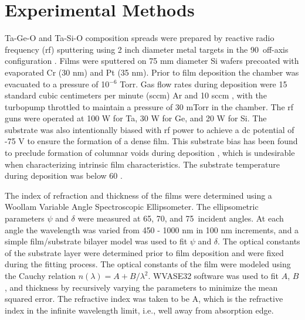 \section{Experimental Methods}
Ta-Ge-O and Ta-Si-O composition spreads were prepared by reactive radio frequency (rf) sputtering using 2 inch diameter metal targets in the 90\textdegree \ off-axis configuration \cite{VanDover1998}. Films were sputtered on 75 mm diameter Si wafers precoated with evaporated Cr (30 nm) and Pt (35 nm). Prior to film deposition the chamber was evacuated to a pressure of 10$^{-6}$ Torr. Gas flow rates during deposition were 15 standard cubic centimeters per minute (sccm) Ar and 10 sccm , with the turbopump throttled to maintain a pressure of 30 mTorr in the chamber. The rf guns were operated at 100 W for Ta, 30 W for Ge, and 20 W for Si. The substrate was also intentionally biased with rf power to achieve a dc potential of -75 V to ensure the formation of a dense film. This substrate bias has been found to preclude formation of columnar voids during deposition \cite{Barron2009}, which is undesirable when characterizing intrinsic film characteristics. The substrate temperature during deposition was below 60 \textcelsius. 

The index of refraction and thickness of the films were determined using a Woollam Variable Angle Spectroscopic Ellipsometer. The ellipsometric parameters $\psi$ and $\delta$ were measured at 65, 70, and 75\textdegree \ incident angles. At each angle the wavelength was varied from 450 - 1000 nm in 100 nm increments, and a simple film/substrate bilayer model was used to fit $\psi$ and $\delta$. The optical constants of the substrate layer were determined prior to film deposition and were fixed during the fitting process. The optical constants of the film were modeled using the Cauchy relation $n(\lambda) =  A + B / \lambda^{2}$. WVASE32 software was used to fit $A$, $B$, and thickness by recursively varying the parameters to minimize the mean squared error. The refractive index was taken to be A, which is the refractive index in the infinite wavelength limit, i.e., well away from absorption edge.

